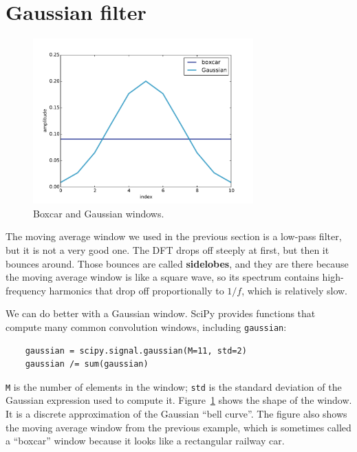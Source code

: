 \documentclass[12pt]{book}
\begin{document}
\section{Gaussian filter}

\begin{figure}
\centerline{\includegraphics[height=2.5in]{figs/convolution7.pdf}}
\caption{Boxcar and Gaussian windows.}
\label{fig.convolution7}
\end{figure}

The moving average window we used in the previous section is
a low-pass filter, but it is not a very good one.
The DFT drops off steeply at
first, but then it bounces around.  Those bounces are
called {\bf sidelobes}, and they are there because the moving
average window is like a square wave, so its spectrum contains
high-frequency harmonics that drop off proportionally to
$1/f$, which is relatively slow.  

We can do better with a Gaussian window.
SciPy provides functions that compute many common convolution windows,
including {\tt gaussian}:

\begin{verbatim}
    gaussian = scipy.signal.gaussian(M=11, std=2)
    gaussian /= sum(gaussian)
\end{verbatim}

{\tt M} is the number of elements in the window; {\tt std}
is the standard deviation of the Gaussian expression used to
compute it.  Figure~\ref{fig.convolution7} shows the shape
of the window.  It is a discrete approximation of the Gaussian
``bell curve''.  The figure also shows the moving average window
from the previous example, which is sometimes called a
``boxcar'' window because it looks like a rectangular railway car.
\end{document}
